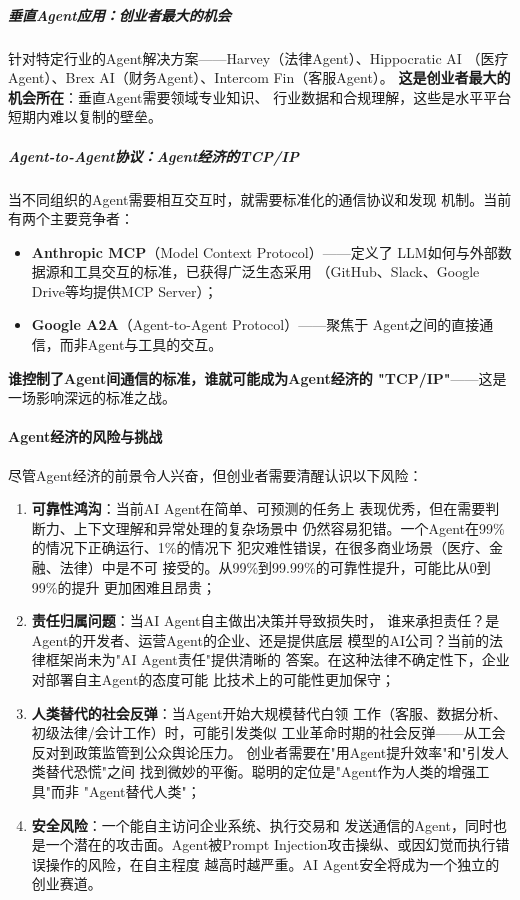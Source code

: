 \subparagraph{垂直Agent应用：创业者最大的机会}
针对特定行业的Agent解决方案——Harvey（法律Agent）、Hippocratic AI
（医疗Agent）、Brex AI（财务Agent）、Intercom Fin（客服Agent）。
\textbf{这是创业者最大的机会所在}：垂直Agent需要领域专业知识、
行业数据和合规理解，这些是水平平台短期内难以复制的壁垒。

\subparagraph{Agent-to-Agent协议：Agent经济的TCP/IP}
当不同组织的Agent需要相互交互时，就需要标准化的通信协议和发现
机制。当前有两个主要竞争者：
\begin{itemize}
  \item \textbf{Anthropic MCP}（Model Context Protocol）——定义了
    LLM如何与外部数据源和工具交互的标准，已获得广泛生态采用
    （GitHub、Slack、Google Drive等均提供MCP Server）；
  \item \textbf{Google A2A}（Agent-to-Agent Protocol）——聚焦于
    Agent之间的直接通信，而非Agent与工具的交互。
\end{itemize}
\textbf{谁控制了Agent间通信的标准，谁就可能成为Agent经济的
"TCP/IP"}——这是一场影响深远的标准之战。

\paragraph{Agent经济的风险与挑战}

尽管Agent经济的前景令人兴奋，但创业者需要清醒认识以下风险：

\begin{enumerate}
  \item \textbf{可靠性鸿沟}：当前AI Agent在简单、可预测的任务上
    表现优秀，但在需要判断力、上下文理解和异常处理的复杂场景中
    仍然容易犯错。一个Agent在99\%的情况下正确运行、1\%的情况下
    犯灾难性错误，在很多商业场景（医疗、金融、法律）中是不可
    接受的。从99\%到99.99\%的可靠性提升，可能比从0到99\%的提升
    更加困难且昂贵；

  \item \textbf{责任归属问题}：当AI Agent自主做出决策并导致损失时，
    谁来承担责任？是Agent的开发者、运营Agent的企业、还是提供底层
    模型的AI公司？当前的法律框架尚未为"AI Agent责任"提供清晰的
    答案。在这种法律不确定性下，企业对部署自主Agent的态度可能
    比技术上的可能性更加保守；

  \item \textbf{人类替代的社会反弹}：当Agent开始大规模替代白领
    工作（客服、数据分析、初级法律/会计工作）时，可能引发类似
    工业革命时期的社会反弹——从工会反对到政策监管到公众舆论压力。
    创业者需要在"用Agent提升效率"和"引发人类替代恐慌"之间
    找到微妙的平衡。聪明的定位是"Agent作为人类的增强工具"而非
    "Agent替代人类"；

  \item \textbf{安全风险}：一个能自主访问企业系统、执行交易和
    发送通信的Agent，同时也是一个潜在的攻击面。Agent被Prompt
    Injection攻击操纵、或因幻觉而执行错误操作的风险，在自主程度
    越高时越严重。AI Agent安全将成为一个独立的创业赛道。
\end{enumerate}

